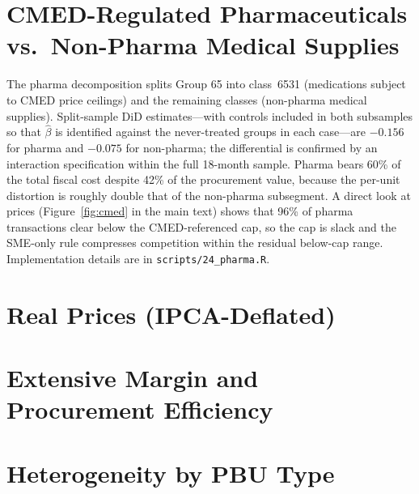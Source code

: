 \documentclass[12pt]{article}
\begin{document}
\section{CMED-Regulated Pharmaceuticals vs.\ Non-Pharma Medical Supplies}


The pharma decomposition splits Group 65 into class~6531 (medications subject to CMED price ceilings) and the remaining classes (non-pharma medical supplies). Split-sample DiD estimates---with controls included in both subsamples so that $\hat\beta$ is identified against the never-treated groups in each case---are $-0.156$ for pharma and $-0.075$ for non-pharma; the differential is confirmed by an interaction specification within the full 18-month sample. Pharma bears 60\% of the total fiscal cost despite 42\% of the procurement value, because the per-unit distortion is roughly double that of the non-pharma subsegment. A direct look at prices (Figure~\ref{fig:cmed} in the main text) shows that 96\% of pharma transactions clear below the CMED-referenced cap, so the cap is slack and the SME-only rule compresses competition within the residual below-cap range. Implementation details are in \texttt{scripts/24\_pharma.R}.

\section{Real Prices (IPCA-Deflated)}


\section{Extensive Margin and Procurement Efficiency}


\section{Heterogeneity by PBU Type}

\end{document}
